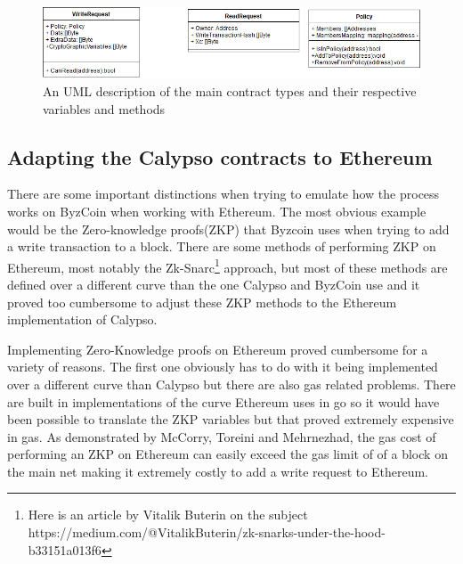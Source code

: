 \documentclass[12pt]{article}
\begin{document}
\begin{figure}[H]
    \centering
    \includegraphics[width=1\textwidth]{UML.png}
    \caption{An UML description of the main contract types and their respective variables and methods}
    \label{fig:UML of contracts}
\end{figure}

\subsection{Adapting the Calypso contracts to Ethereum}

There are some important distinctions when trying to emulate how the process works on ByzCoin when working with Ethereum. The most obvious example would be the Zero-knowledge proofs(ZKP) that Byzcoin uses when trying to add a write transaction to a block. There are some methods of performing ZKP on Ethereum, most notably the Zk-Snarc\footnote{Here is an article by Vitalik Buterin on the subject https://medium.com/@VitalikButerin/zk-snarks-under-the-hood-b33151a013f6} approach, but most of these methods are defined over a different curve than the one Calypso and ByzCoin use and it proved too cumbersome to adjust these ZKP methods to the Ethereum implementation of Calypso.

Implementing Zero-Knowledge proofs on Ethereum proved cumbersome for a variety of reasons. The first one obviously has to do with it being implemented over a different curve than Calypso but there are also gas related problems. There are built in implementations of the curve Ethereum uses in go so it would have been possible to translate the ZKP variables but that proved extremely expensive in gas. As demonstrated by McCorry, Toreini and Mehrnezhad\cite{Toreini2016RemovingTT}, the gas cost of performing an ZKP on Ethereum can easily exceed the gas limit of of a block on the main net making it extremely costly to add a write request to Ethereum.
\end{document}
